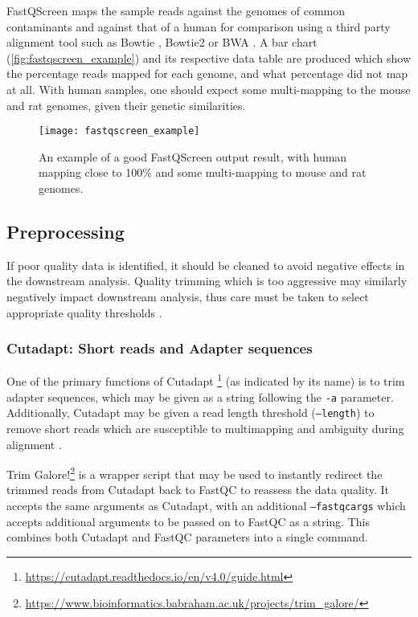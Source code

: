 FastQScreen maps the sample reads against the genomes of common contaminants and against that of a human for comparison using a third party alignment tool such as Bowtie \citep{bowtie}, Bowtie2 \citep{bowtie2} or BWA \citep{bwa}. A bar chart (\autoref{fig:fastqscreen_example}) and its respective data table are produced which show the percentage reads mapped for each genome, and what percentage did not map at all. With human samples, one should expect some multi-mapping to the mouse and rat genomes, given their genetic similarities.

\begin{figure}[!ht]
    \centering
    \texttt{[image: fastqscreen\_example]}
    \caption[FastQScreen plot example]{An example of a good FastQScreen output result, with human mapping close to 100\% and some multi-mapping to mouse and rat genomes. } 
    \label{fig:fastqscreen_example}
\end{figure}
\clearpage

\subsection{Preprocessing}
If poor quality data is identified, it should be cleaned to avoid negative effects in the downstream analysis. Quality trimming which is too aggressive may similarly negatively impact downstream analysis, thus care must be taken to select appropriate quality thresholds \citep{davis2019}.

\subsubsection{Cutadapt: Short reads and Adapter sequences}
\label{cutadapt}
One of the primary functions of Cutadapt \footnote{\url{https://cutadapt.readthedocs.io/en/v4.0/guide.html}} \citep{martin2011cutadapt} (as indicated by its name) is to trim adapter sequences, which may be given as a string following the \texttt{-a} parameter. Additionally, Cutadapt may be given a read length threshold (\texttt{--length}) to remove short reads which are susceptible to multimapping and ambiguity during alignment \citep{deschamps2020handling}. 

Trim Galore!\footnote{\url{https://www.bioinformatics.babraham.ac.uk/projects/trim_galore/}} \citep{trimgalore} is a wrapper script that may be used to instantly redirect the trimmed reads from Cutadapt back to FastQC to reassess the data quality. It accepts the same arguments as Cutadapt, with an additional \texttt{--fastqc\textunderscore args} which accepts additional arguments to be passed on to FastQC as a string. This combines both Cutadapt and FastQC parameters into a single command. 

